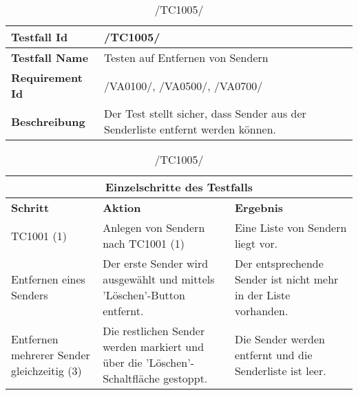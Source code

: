 \begin{table}[h]
\caption{/TC1005/}
\label{tab:TC1005}
\begin{center}
\begin{tabular}{|p{3.5cm}|p{9cm}|}
\hline
\textbf{Testfall Id} & /TC1005/\\
\hline
\textbf{Testfall Name} & Testen auf Entfernen von Sendern
\\
\hline
\textbf{Requirement Id} & /VA0100/, /VA0500/, /VA0700/\\
\hline
\textbf{Beschreibung} & Der Test stellt sicher, dass Sender aus der Senderliste
entfernt werden können.
\\
\hline
\end{tabular}
\begin{tabular}{|p{2.5cm}|p{5cm}|p{4.55cm}|}
\multicolumn{3}{|c|}{\textbf{Einzelschritte des Testfalls}} \\
\hline
\textbf{Schritt} & \textbf{Aktion} & \textbf{Ergebnis}\\
\hline
TC1001 (1) & Anlegen von Sendern nach TC1001 (1) & Eine Liste
 von Sendern liegt vor.
\\
\hline
Entfernen eines Senders & Der erste Sender wird ausgewählt und mittels
 'Löschen'-Button entfernt. & Der entsprechende Sender ist nicht mehr in der Liste
 vorhanden.
\\
\hline
Entfernen mehrerer Sender gleichzeitig (3) & Die restlichen Sender werden
markiert und über die 'Löschen'-Schaltfläche gestoppt. & Die Sender
werden entfernt und die Senderliste ist leer.
\\
\hline
\end{tabular}
\end{center}
\end{table}

